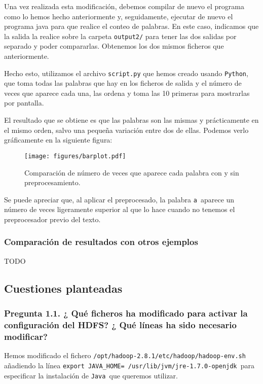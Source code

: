 \documentclass[11pt]{article}
\def\inline{\lstinline[basicstyle=\ttfamily,keywordstyle={}]}
\begin{document}
Una vez realizada esta modificación, debemos compilar de nuevo el programa como lo hemos hecho anteriormente y, seguidamente, ejecutar de nuevo el programa java para que realice el conteo de palabras. En este caso, indicamos que la salida la realice sobre la carpeta  \inline{output2/} para tener las dos salidas por separado y poder compararlas. Obtenemos los dos mismos ficheros que anteriormente.

Hecho esto, utilizamos el archivo  \inline{script.py} que hemos creado usando  \inline{Python}, que toma todas las palabras que hay en los ficheros de salida y el número de veces que aparece cada una, las ordena y toma las 10 primeras para mostrarlas por pantalla. 

El resultado que se obtiene es que las palabras son las mismas y prácticamente en el mismo orden, salvo una pequeña variación entre dos de ellas. Podemos verlo gráficamente en la siguiente figura:

\begin{figure}[H]
\centering
\texttt{[image: figures/barplot.pdf]}
\caption{Comparación de número de veces que aparece cada palabra con y sin preprocesamiento.}
\end{figure}

Se puede apreciar que, al aplicar el preprocesado, la palabra \inline{a }aparece un número de veces ligeramente superior al que lo hace cuando no tenemos el preprocesador previo del texto.


\subsubsection*{ Comparación de resultados con otros ejemplos}

TODO







\subsection{ Cuestiones planteadas}

\subsubsection*{ Pregunta 1.1. ¿ Qué ficheros ha modificado para activar la configuración del HDFS? ¿ Qué líneas ha sido necesario modificar?}

Hemos modificado el fichero \inline{/opt/hadoop-2.8.1/etc/hadoop/hadoop-env.sh }añadiendo la línea \inline{export JAVA_HOME= /usr/lib/jvm/jre-1.7.0-openjdk }para especificar la instalación de \inline{Java }que queremos utilizar.
\end{document}
